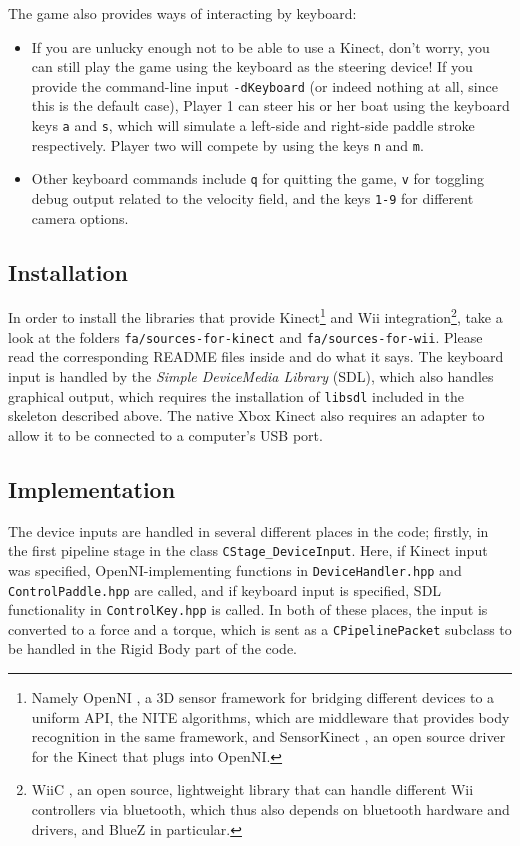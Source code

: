 The game also provides ways of interacting by keyboard:
\begin{itemize}
\item If you are unlucky enough not to be able to use a Kinect, don't worry, you can still play the game using the keyboard as the steering device! If you provide the command-line input \texttt{-dKeyboard} (or indeed nothing at all, since this is the default case), Player 1 can steer his or her boat using the keyboard keys \texttt{a} and \texttt{s}, which will simulate a left-side and right-side paddle stroke respectively. Player two will compete by using the keys \texttt{n} and \texttt{m}.
\item Other keyboard commands include \texttt{q} for quitting the game, \texttt{v} for toggling debug output related to the velocity field, and the keys \texttt{1-9} for different camera options.
\end{itemize}



\subsection{Installation}
In order to install the libraries that provide Kinect\footnote{Namely OpenNI \cite{OpenNI}, a 3D sensor framework for bridging different devices to a uniform API, the NITE algorithms, which are middleware that provides body recognition in the same framework, and SensorKinect \cite{SensorKinect}, an open source driver for the Kinect that plugs into OpenNI.}  and Wii integration\footnote{WiiC \cite{WiiC}, an open source, lightweight library that can handle different Wii controllers via bluetooth, which thus also depends on bluetooth hardware and drivers, and BlueZ in particular.}, take a look at the folders \texttt{fa/sources-for-kinect} and \texttt{fa/sources-for-wii}. Please read the corresponding README files inside and do what it says. The keyboard input is handled by the \emph{Simple DeviceMedia Library} (SDL), which also handles graphical output, which requires the installation of \texttt{libsdl} included in the skeleton described above. The native Xbox Kinect also requires an adapter to allow it to be connected to a computer's USB port.

\subsection{Implementation}
The device inputs are handled in several different places in the code; firstly, in the first pipeline stage in the class \texttt{CStage_DeviceInput}. Here, if Kinect input was specified, OpenNI-implementing functions in \texttt{DeviceHandler.hpp} and \texttt{ControlPaddle.hpp} are called, and if keyboard input is specified, SDL functionality in \texttt{ControlKey.hpp} is called. In both of these places, the input is converted to a force and a torque, which is sent as a \texttt{CPipelinePacket} subclass to be handled in the Rigid Body part of the code.

